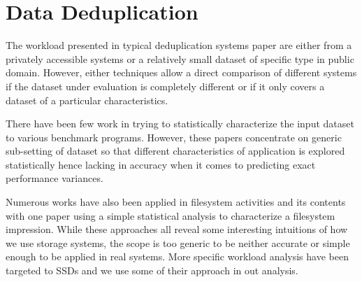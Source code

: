 \section{Data Deduplication}
\label{DD}

The workload presented in typical deduplication systems paper are either from a privately accessible systems\cite{clements:2009, Rhea:2008, manber:1994, Aronovich:2009, Lillibridge:2009, Zhu:2008} or a relatively small dataset of specific type in public domain\cite{Storer:2008, kruus,eshghi:2005}. 
However, either techniques allow a direct comparison of different systems if the dataset under evaluation is completely different or if it only covers a dataset of a particular characteristics.

There have been few work in trying to statistically characterize the input dataset to various benchmark programs\cite{Eeckhout:2003, Yi:2002, Hsu:2002}. 
However, these papers concentrate on generic sub-setting of dataset so that different characteristics of application is explored statistically hence lacking in accuracy when it comes to predicting exact performance variances.

Numerous works have also been applied in filesystem activities and its contents\cite{douceur1999large, Leung:2008:MAL:1404014.1404030, Douceur:1999:LSF:301464.301480} with one paper using a simple statistical analysis to characterize a filesystem impression\cite{ Agrawal:2009:GRI:1629080.1629086}. 
While these approaches all reveal some interesting intuitions of how we use storage systems, the scope is too generic to be neither accurate or simple enough to be applied in real systems. 
More specific workload analysis have been targeted to SSDs\cite{ soundararajan2010extending} and we use some of their approach in out analysis.
